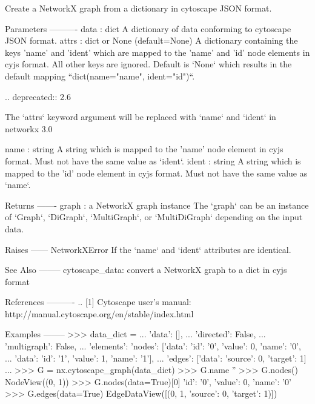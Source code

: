 \begin{DoxyVerb}Create a NetworkX graph from a dictionary in cytoscape JSON format.

Parameters
----------
data : dict
    A dictionary of data conforming to cytoscape JSON format.
attrs : dict or None (default=None)
    A dictionary containing the keys 'name' and 'ident' which are mapped to
    the 'name' and 'id' node elements in cyjs format. All other keys are
    ignored. Default is `None` which results in the default mapping
    ``dict(name="name", ident="id")``.

    .. deprecated:: 2.6

       The `attrs` keyword argument will be replaced with `name` and
       `ident` in networkx 3.0

name : string
    A string which is mapped to the 'name' node element in cyjs format.
    Must not have the same value as `ident`.
ident : string
    A string which is mapped to the 'id' node element in cyjs format.
    Must not have the same value as `name`.

Returns
-------
graph : a NetworkX graph instance
    The `graph` can be an instance of `Graph`, `DiGraph`, `MultiGraph`, or
    `MultiDiGraph` depending on the input data.

Raises
------
NetworkXError
    If the `name` and `ident` attributes are identical.

See Also
--------
cytoscape_data: convert a NetworkX graph to a dict in cyjs format

References
----------
.. [1] Cytoscape user's manual:
   http://manual.cytoscape.org/en/stable/index.html

Examples
--------
>>> data_dict = {
...     'data': [],
...     'directed': False,
...     'multigraph': False,
...     'elements': {'nodes': [{'data': {'id': '0', 'value': 0, 'name': '0'}},
...       {'data': {'id': '1', 'value': 1, 'name': '1'}}],
...      'edges': [{'data': {'source': 0, 'target': 1}}]}
... }
>>> G = nx.cytoscape_graph(data_dict)
>>> G.name
''
>>> G.nodes()
NodeView((0, 1))
>>> G.nodes(data=True)[0]
{'id': '0', 'value': 0, 'name': '0'}
>>> G.edges(data=True)
EdgeDataView([(0, 1, {'source': 0, 'target': 1})])
\end{DoxyVerb}
 